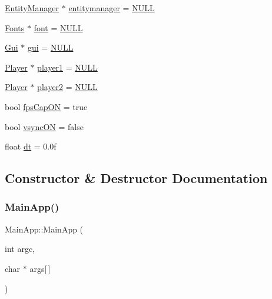 \begin{DoxyCompactItemize}
\item 
\mbox{\hyperlink{class_entity_manager}{Entity\+Manager}} $\ast$ \mbox{\hyperlink{class_main_app_a051ac578b8f1f72175aa120f14d0ef4f}{entitymanager}} = \mbox{\hyperlink{_defs_8h_a070d2ce7b6bb7e5c05602aa8c308d0c4}{N\+U\+LL}}
\item 
\mbox{\hyperlink{class_fonts}{Fonts}} $\ast$ \mbox{\hyperlink{class_main_app_abda35a9609b299c1e5c4ba9abb5c8176}{font}} = \mbox{\hyperlink{_defs_8h_a070d2ce7b6bb7e5c05602aa8c308d0c4}{N\+U\+LL}}
\item 
\mbox{\hyperlink{class_gui}{Gui}} $\ast$ \mbox{\hyperlink{class_main_app_a982a4771701a0e6cffd05ffc456bbfeb}{gui}} = \mbox{\hyperlink{_defs_8h_a070d2ce7b6bb7e5c05602aa8c308d0c4}{N\+U\+LL}}
\item 
\mbox{\hyperlink{class_player}{Player}} $\ast$ \mbox{\hyperlink{class_main_app_a75dcabc1589292588e912c93fbc92bcb}{player1}} = \mbox{\hyperlink{_defs_8h_a070d2ce7b6bb7e5c05602aa8c308d0c4}{N\+U\+LL}}
\item 
\mbox{\hyperlink{class_player}{Player}} $\ast$ \mbox{\hyperlink{class_main_app_a294df033f18318eb240fa8e991ec0811}{player2}} = \mbox{\hyperlink{_defs_8h_a070d2ce7b6bb7e5c05602aa8c308d0c4}{N\+U\+LL}}
\item 
bool \mbox{\hyperlink{class_main_app_a269905e95286cf7d61da42da263c4e6f}{fps\+Cap\+ON}} = true
\item 
bool \mbox{\hyperlink{class_main_app_abfd84f18aeef355427230f1e43f2d3c9}{vsync\+ON}} = false
\item 
float \mbox{\hyperlink{class_main_app_a390db6b237e58249133985dd8849712a}{dt}} = 0.\+0f
\end{DoxyCompactItemize}


\subsection{Constructor \& Destructor Documentation}
\mbox{\label{class_main_app_a29ac7c9a40977302f01f9d9176eedd0e}} 
\subsubsection{\texorpdfstring{MainApp()}{MainApp()}}
{\footnotesize\ttfamily Main\+App\+::\+Main\+App (\begin{DoxyParamCaption}\item[{int}]{argc,  }\item[{char $\ast$}]{args\mbox{[}$\,$\mbox{]} }\end{DoxyParamCaption})}

